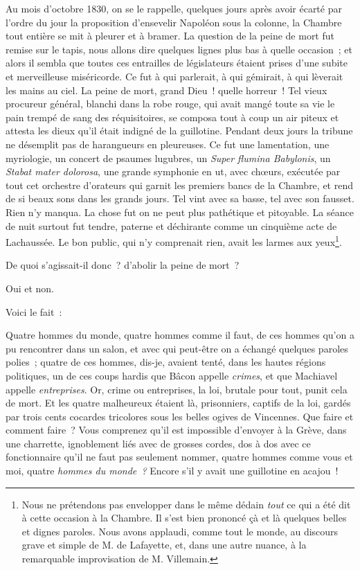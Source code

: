 \documentclass[french,twoside]{book} %
\begin{document}
Au mois d’octobre 1830, on se le rappelle, quelques jours après avoir écarté par l’ordre du jour la proposition d’ensevelir Napoléon sous la colonne, la Chambre tout entière se mit à pleurer et à bramer. La question de la peine de mort fut remise sur le tapis, nous allons dire quelques lignes plus bas à quelle occasion ; et alors il sembla que toutes ces entrailles de législateurs étaient prises d’une subite et merveilleuse miséricorde. Ce fut à qui parlerait, à qui gémirait, à qui lèverait les mains au ciel. La peine de mort, grand Dieu ! quelle horreur ! Tel vieux procureur général, blanchi dans la robe rouge, qui avait mangé toute sa vie le pain trempé de sang des réquisitoires, se composa tout à coup un air piteux et attesta les dieux qu’il était  indigné de la guillotine. Pendant deux jours la tribune ne désemplit pas de harangueurs en pleureuses. Ce fut une lamentation, une myriologie, un concert de psaumes lugubres, un \emph{Super flumina Babylonis}, un \emph{Stabat mater dolorosa}, une grande symphonie en ut, avec chœurs, exécutée par tout cet orchestre d’orateurs qui garnit les premiers bancs de la Chambre, et rend de si beaux sons dans les grands jours. Tel vint avec sa basse, tel avec son fausset. Rien n’y manqua. La chose fut on ne peut plus pathétique et pitoyable. La séance de nuit surtout fut tendre, paterne et déchirante comme un cinquième acte de Lachaussée. Le bon public, qui n’y comprenait rien, avait les larmes aux yeux\footnote{ \noindent Nous ne prétendons pas envelopper dans le même dédain \emph{tout} ce qui a été dit à cette occasion à la Chambre. Il s’est bien prononcé çà et là quelques belles et dignes paroles. Nous avons applaudi, comme tout le monde, au discours grave et simple de M. de Lafayette, et, dans une autre nuance, à la remarquable improvisation de M. Villemain.
 }.\par
De quoi s’agissait-il donc ? d’abolir la peine de mort ?\par
Oui et non.\par
Voici le fait :\par
Quatre hommes du monde, quatre hommes comme il faut, de ces hommes qu’on a pu rencontrer dans un salon, et avec qui peut-être on a échangé quelques paroles polies ; quatre de ces hommes, dis-je, avaient tenté, dans les hautes régions politiques, un de ces coups hardis que Bâcon appelle \emph{crimes}, et que Machiavel appelle \emph{entreprises}. Or, crime ou entreprises, la loi, brutale pour tout, punit cela de mort. Et les quatre malheureux étaient là, prisonniers, captifs de la loi, gardés par trois cents cocardes tricolores sous les belles ogives de Vincennes. Que faire et comment faire ? Vous comprenez qu’il est impossible d’envoyer à la Grève,  dans une charrette, ignoblement liés avec de grosses cordes, dos à dos avec ce fonctionnaire qu’il ne faut pas seulement nommer, quatre hommes comme vous et moi, quatre \emph{hommes du monde ?} Encore s’il y avait une guillotine en acajou !\par
\end{document}

